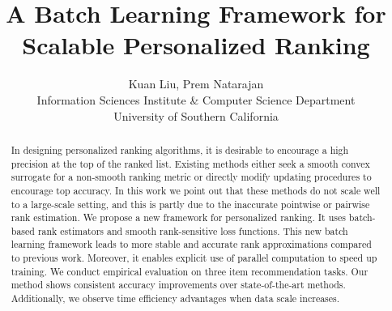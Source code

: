 \documentclass[letterpaper]{article} %
\begin{document}
%
\title{A Batch Learning Framework for Scalable Personalized Ranking}
\author{Kuan Liu, Prem Natarajan\\
Information Sciences Institute \& Computer Science Department\\
University of Southern California\\
}
\maketitle
\begin{abstract}
In designing personalized ranking algorithms, it is desirable to encourage a high precision at the top of the ranked list. Existing methods either seek a smooth convex surrogate for a non-smooth ranking metric or directly modify updating procedures to encourage top accuracy. In this work we point out that these methods do not scale well to a large-scale setting, and this is partly due to the inaccurate pointwise or pairwise rank estimation. We propose a new framework for personalized ranking. It uses batch-based rank estimators and smooth rank-sensitive loss functions. This new batch learning framework leads to more stable and accurate rank approximations compared to previous work. Moreover, it enables explicit use of parallel computation to speed up training. We conduct empirical evaluation on three item recommendation tasks. Our method shows consistent accuracy improvements over state-of-the-art methods. Additionally, we observe time efficiency advantages when data scale increases.



\end{abstract}
\end{document}
